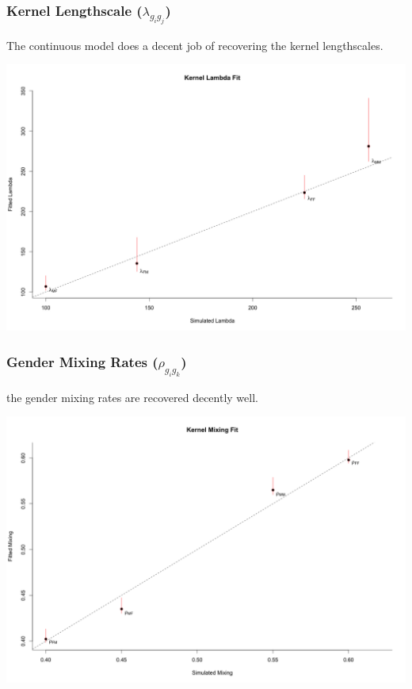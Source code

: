 \documentclass[12pt]{article}
\begin{document}
\subsubsection*{Kernel Lengthscale ($\lambda_{g_ig_j}$)}
The continuous model does a decent job of recovering the kernel lengthscales.

\begin{center}
\includegraphics[scale = 0.34]{fig/fit_lambda_reg.png}
\end{center}

\pagebreak
\subsubsection*{Gender Mixing Rates ($\rho_{g_ig_k}$)}
\noindent the gender mixing rates are recovered decently well.

\begin{center}
\includegraphics[scale = 0.34]{fig/fit_mix_reg.png}
\end{center}
\end{document}
